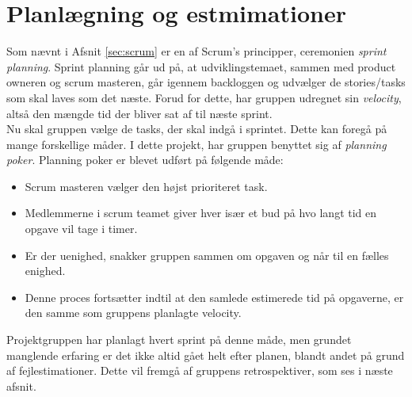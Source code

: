 \section{Planlægning og estmimationer}\label{sec:planning}
Som nævnt i Afsnit \ref{sec:scrum} er en af Scrum's principper, ceremonien \textit{sprint planning}.
Sprint planning går ud på, at udviklingstemaet, sammen med product owneren og scrum masteren, går igennem
backloggen og udvælger de stories/tasks som skal laves som det næste. Forud for dette, har gruppen udregnet sin 
\textit{velocity}, altså den mængde tid der bliver sat af til næste sprint. \\

Nu skal gruppen vælge de tasks, der skal indgå i sprintet. Dette kan foregå på mange forskellige måder.
I dette projekt, har gruppen benyttet sig af \textit{planning poker}. Planning poker er blevet udført på følgende måde:

\begin{itemize}
    \item Scrum masteren vælger den højst prioriteret task.
    \item Medlemmerne i scrum teamet giver hver især et bud på hvo langt tid en opgave vil tage i timer.
    \item Er der uenighed, snakker gruppen sammen om opgaven og når til en fælles enighed.
    \item Denne proces fortsætter indtil at den samlede estimerede tid på opgaverne, er den samme som gruppens planlagte velocity.
\end{itemize}

Projektgruppen har planlagt hvert sprint på denne måde, men grundet manglende erfaring er det ikke altid gået helt efter planen, blandt andet på grund
af fejlestimationer. Dette vil fremgå af gruppens retrospektiver, som ses i næste afsnit.